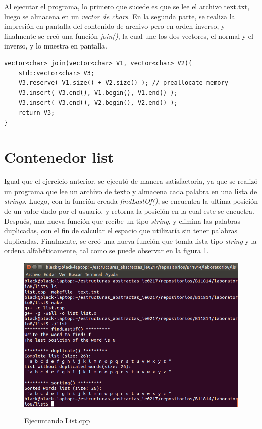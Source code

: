 \documentclass{article}
\begin{document}
Al ejecutar el programa, lo primero que sucede es que se lee el archivo text.txt, luego se almacena en un \textit{vector de chars}. En la segunda parte, se realiza la impresi\' on en pantalla del contenido de archivo pero en orden inverso, y finalmente se cre\' o una funci\' on \textit{join()},  la cual une los dos vectores, el normal y el inverso, y lo muestra en pantalla.

\begin{verbatim}
vector<char> join(vector<char> V1, vector<char> V2){	
	std::vector<char> V3;
	V3.reserve( V1.size() + V2.size() ); // preallocate memory
	V3.insert( V3.end(), V1.begin(), V1.end() );
	V3.insert( V3.end(), V2.begin(), V2.end() );
	return V3;
}
\end{verbatim}

\section{Contenedor list}
Igual que el ejercicio anterior, se ejecut\' o de manera satisfactoria, ya que se realiz\' o un programa que lee un archivo de texto y almacena cada palabra en una lista de \textit{strings}.
Luego, con la funci\' on creada \textit{findLastOf()}, se encuentra la ultima posici\' on de un valor dado por el usuario, y retorna la posici\' on en la cual este se encuetra.
Despu\' es, una nueva funci\' on que recibe un tipo \textit{string}, y elimina las palabras duplicadas, con el fin de calcular el espacio que utilizar\' ia sin tener palabras duplicadas.
Finalmente,  se cre\' o una nueva funci\' on que tomla lista tipo \textit{string} y la ordena alfab\' eticamente, tal como se puede observar en la figura \ref{fig:list}.

\begin{figure}[hbtp]
\caption{Ejecuntando List.cpp}
\centering
\includegraphics[scale=0.6]{imagenes/list.png}
\label{fig:list}
\end{figure}
\end{document}
